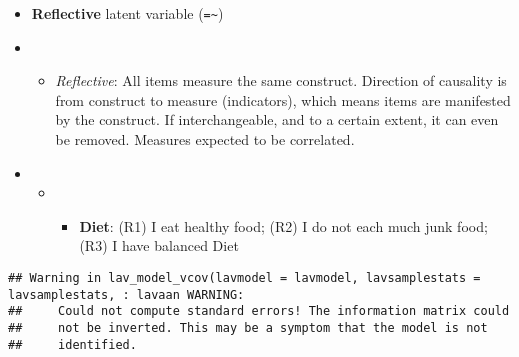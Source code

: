 \documentclass[
]{article}
\newenvironment{Shaded}{\begin{snugshade}}{\end{snugshade}}
\newcommand{\AttributeTok}[1]{\textcolor[rgb]{0.77,0.63,0.00}{#1}}
\newcommand{\ConstantTok}[1]{\textcolor[rgb]{0.00,0.00,0.00}{#1}}
\newcommand{\FloatTok}[1]{\textcolor[rgb]{0.00,0.00,0.81}{#1}}
\newcommand{\FunctionTok}[1]{\textcolor[rgb]{0.00,0.00,0.00}{#1}}
\newcommand{\NormalTok}[1]{#1}
\newcommand{\OtherTok}[1]{\textcolor[rgb]{0.56,0.35,0.01}{#1}}
\newcommand{\SpecialCharTok}[1]{\textcolor[rgb]{0.00,0.00,0.00}{#1}}
\newcommand{\StringTok}[1]{\textcolor[rgb]{0.31,0.60,0.02}{#1}}
\providecommand{\tightlist}{%
  \setlength{\itemsep}{0pt}\setlength{\parskip}{0pt}}
\begin{document}
\begin{itemize}
\item
  \textbf{Reflective} latent variable (\texttt{=\textasciitilde{}})
\item
  \begin{itemize}
  \tightlist
  \item
    \emph{Reflective}: All items measure the same construct. Direction
    of causality is from construct to measure (indicators), which means
    items are manifested by the construct. If interchangeable, and to a
    certain extent, it can even be removed. Measures expected to be
    correlated.
  \end{itemize}
\item
  \begin{itemize}
  \item
    \begin{itemize}
    \tightlist
    \item
      \textbf{Diet}: (R1) I eat healthy food; (R2) I do not each much
      junk food; (R3) I have balanced Diet
    \end{itemize}
  \end{itemize}
\end{itemize}

\begin{Shaded}
\end{Shaded}

\begin{verbatim}
## Warning in lav_model_vcov(lavmodel = lavmodel, lavsamplestats = lavsamplestats, : lavaan WARNING:
##     Could not compute standard errors! The information matrix could
##     not be inverted. This may be a symptom that the model is not
##     identified.
\end{verbatim}

\begin{Shaded}
\end{Shaded}
\end{document}
